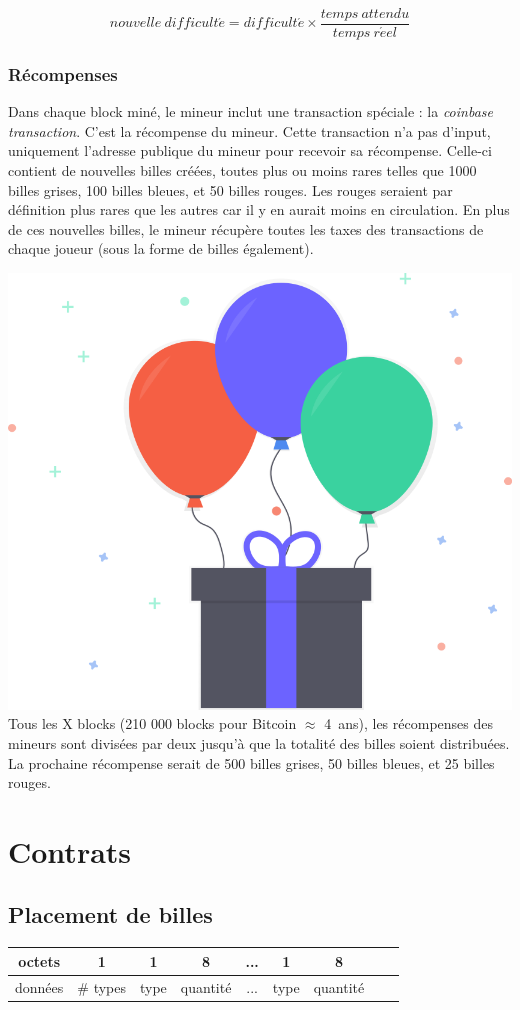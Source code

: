 \documentclass{article}
\begin{document}
\[ nouvelle\ difficult\acute{e} = difficult\acute{e} \times \frac{temps\ attendu}{temps\ r\acute{e}el} \]

\subsubsection{Récompenses}
Dans chaque block miné, le mineur inclut une transaction spéciale : la \textit{coinbase transaction}. C'est la récompense du mineur.
Cette transaction n'a pas d'input, uniquement l'adresse publique du mineur pour recevoir sa récompense.
Celle-ci contient de nouvelles billes créées, toutes plus ou moins rares telles que 1000 billes grises, 100 billes bleues, et 50 billes rouges. Les rouges seraient par définition plus rares que les autres car il y en aurait moins en circulation.
En plus de ces nouvelles billes, le mineur récupère toutes les taxes des transactions de chaque joueur (sous la forme de billes également).

\includegraphics[width=0.3\linewidth]{assets/gift.png}\\

Tous les X blocks (210 000 blocks pour Bitcoin $\approx$ 4\ ans), les récompenses des mineurs sont divisées par deux jusqu'à que la totalité des billes soient distribuées.
La prochaine récompense serait de 500 billes grises, 50 billes bleues, et 25 billes rouges.

\newpage
\section{Contrats}
\subsection*{Placement de billes}
\hspace*{-1cm}%
\begin{tabular}{ |c|c|c|c|c|c|c|c|c| } 
 \hline
octets & 1 & 1 & 8 & ... & 1 & 8\\ 
 \hline
    données & \# types & type & quantité & ... & type & quantité \\ 
 \hline
\end{tabular}
\end{document}
